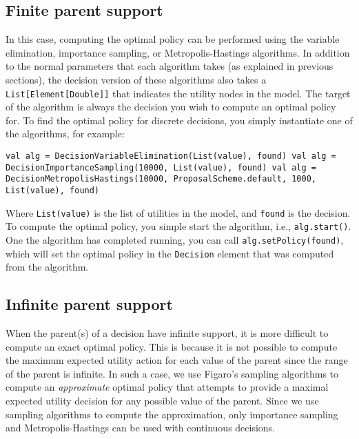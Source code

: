 \subsection{Finite parent support}

In this case, computing the optimal policy can be performed using the variable elimination, importance sampling, or Metropolis-Hastings algorithms. In addition to the normal parameters that each algorithm takes (as explained in previous sections), the decision version of these algorithms also takes a \texttt{List[Element[Double]]} that indicates the utility nodes in the model. The target of the algorithm is always the decision you wish to compute an optimal policy for. To find the optimal policy for discrete decisions, you simply instantiate one of the algorithms, for example:

\begin{flushleft}
\texttt{val alg = DecisionVariableElimination(List(value), found)
\newline val alg = DecisionImportanceSampling(10000,	List(value), found)
\newline val alg = DecisionMetropolisHastings(10000, ProposalScheme.default,
1000, List(value), found)
}
\end{flushleft}

Where \texttt{List(value)} is the list of utilities in the model, and \texttt{found} is the decision. To compute the optimal policy, you simple start the algorithm, i.e., \texttt{alg.start()}. One the algorithm has completed running, you can call \texttt{alg.setPolicy(found)}, which will set the optimal policy in the \texttt{Decision} element that was computed from the algorithm.

\subsection{Infinite parent support}

When the parent(s) of a decision have infinite support, it is more difficult to compute an exact optimal policy. This is because it is not possible to compute the maximum expected utility action for each value of the parent since the range of the parent is infinite. In such a case, we use Figaro's sampling algorithms to compute an \emph{approximate} optimal policy that attempts to provide a maximal expected utility decision for any possible value of the parent. Since we use sampling algorithms to compute the approximation, only importance sampling and Metropolis-Hastings can be used with continuous decisions.

